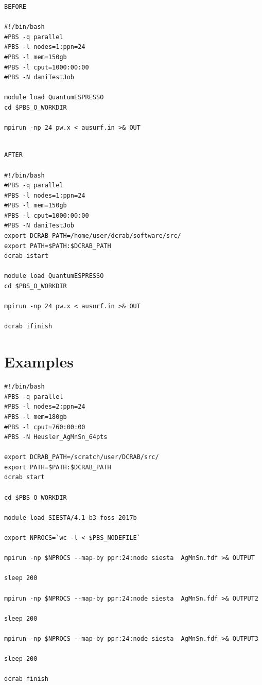 \documentclass[10pt,a4paper]{report}
\begin{document}
\pagebreak

\begin{multicols}{2}
\begin{verbatim}
BEFORE

#!/bin/bash
#PBS -q parallel
#PBS -l nodes=1:ppn=24
#PBS -l mem=150gb
#PBS -l cput=1000:00:00
#PBS -N daniTestJob

module load QuantumESPRESSO
cd $PBS_O_WORKDIR

mpirun -np 24 pw.x < ausurf.in >& OUT

\end{verbatim}

\columnbreak

\begin{verbatim}

AFTER

#!/bin/bash
#PBS -q parallel
#PBS -l nodes=1:ppn=24
#PBS -l mem=150gb
#PBS -l cput=1000:00:00
#PBS -N daniTestJob
export DCRAB_PATH=/home/user/dcrab/software/src/
export PATH=$PATH:$DCRAB_PATH
dcrab istart

module load QuantumESPRESSO
cd $PBS_O_WORKDIR

mpirun -np 24 pw.x < ausurf.in >& OUT

dcrab ifinish
\end{verbatim}
\end{multicols}

\chapter{Examples}

\begin{verbatim}
#!/bin/bash
#PBS -q parallel
#PBS -l nodes=2:ppn=24
#PBS -l mem=180gb
#PBS -l cput=760:00:00
#PBS -N Heusler_AgMnSn_64pts

export DCRAB_PATH=/scratch/user/DCRAB/src/
export PATH=$PATH:$DCRAB_PATH
dcrab start

cd $PBS_O_WORKDIR

module load SIESTA/4.1-b3-foss-2017b

export NPROCS=`wc -l < $PBS_NODEFILE`

mpirun -np $NPROCS --map-by ppr:24:node siesta  AgMnSn.fdf >& OUTPUT

sleep 200

mpirun -np $NPROCS --map-by ppr:24:node siesta  AgMnSn.fdf >& OUTPUT2

sleep 200

mpirun -np $NPROCS --map-by ppr:24:node siesta  AgMnSn.fdf >& OUTPUT3

sleep 200

dcrab finish
\end{verbatim}
\end{document}

